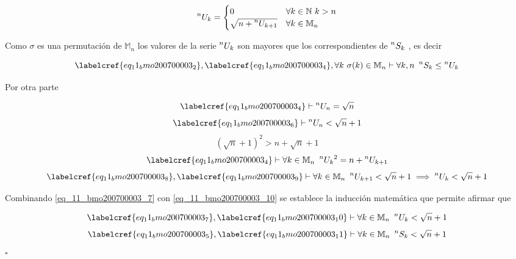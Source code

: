 \begin{equation} \label{eq_11_bmo200700003_4}
	\prescript{n}{}{U_k} = 
	\begin{cases}
		0 & \forall k \in \mathbb{N}\ k > n \\
		\sqrt{n + \prescript{n}{}{U_{k+1}}} & \forall k \in \mathbb{M}\textsubscript{n}
	\end{cases}
\end{equation}

Como $\sigma$ es una permutación de $\mathbb{M}_n$ los valores de la serie $\prescript{n}{}{U_k}$ son mayores que los correspondientes de $\prescript{n}{}{S_k}$ , es decir

\begin{equation} \label{eq_11_bmo200700003_5}
	 \labelcref{eq_11_bmo200700003_2},  \labelcref{eq_11_bmo200700003_4}, \forall  k\ \sigma(k) \in \mathbb{M}_n \vdash \forall k,n\ \prescript{n}{}{S_k} \leq \prescript{n}{}{U_k}
\end{equation}

Por otra parte 

\begin{equation} \label{eq_11_bmo200700003_6}
	\labelcref{eq_11_bmo200700003_4} \vdash \prescript{n}{}{U_n} = \sqrt{n}
\end{equation}
\begin{equation} \label{eq_11_bmo200700003_7}
	\labelcref{eq_11_bmo200700003_6} \vdash \prescript{n}{}{U_n} < \sqrt{n} + 1
\end{equation}
\begin{equation} \label{eq_11_bmo200700003_8}
	(\sqrt{n} + 1)^2 > n + \sqrt{n} + 1
\end{equation}
\begin{equation} \label{eq_11_bmo200700003_9}
	\labelcref{eq_11_bmo200700003_4} \vdash \forall k \in \mathbb{M}_n\ \prescript{n}{}{U_k}^2 = n + \prescript{n}{}{U_{k+1}}
\end{equation}
\begin{equation} \label{eq_11_bmo200700003_10}
	\labelcref{eq_11_bmo200700003_8}, \labelcref{eq_11_bmo200700003_9} \vdash \forall k \in \mathbb{M}_n\ \prescript{n}{}{U_{k+1}} < \sqrt{n} + 1 \implies \prescript{n}{}{U_{k}} < \sqrt{n} + 1
\end{equation}

Combinando \cref{eq_11_bmo200700003_7} con \cref{eq_11_bmo200700003_10} se establece la inducción matemática que permite afirmar que 

\begin{equation} \label{eq_11_bmo200700003_11}
	\labelcref{eq_11_bmo200700003_7}, \labelcref{eq_11_bmo200700003_10} \vdash \forall k \in \mathbb{M}_n\ \prescript{n}{}{U_{k}} < \sqrt{n} + 1
\end{equation}
\begin{equation} \label{eq_11_bmo200700003_11a}
	\labelcref{eq_11_bmo200700003_5}, \labelcref{eq_11_bmo200700003_11} \vdash \forall k \in \mathbb{M}_n\ \prescript{n}{}{S_{k}} < \sqrt{n} + 1
\end{equation}
\hfill $\square$

